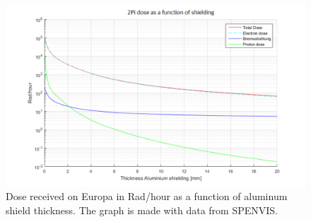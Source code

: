 \begin{figure}[htb]
\begin{center}
\includegraphics[scale=0.5]{figures/navtheory/dose}
\caption{Dose received on Europa in Rad/hour as a function of aluminum shield thickness. The graph is made with data from SPENVIS.}
\label{fig:raddose}
\end{center}
\end{figure}




